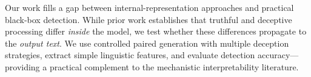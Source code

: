 Our work fills a gap between internal-representation approaches and practical black-box detection. While prior work establishes that truthful and deceptive processing differ \emph{inside} the model, we test whether these differences propagate to the \emph{output text}. We use controlled paired generation with multiple deception strategies, extract simple linguistic features, and evaluate detection accuracy---providing a practical complement to the mechanistic interpretability literature.

